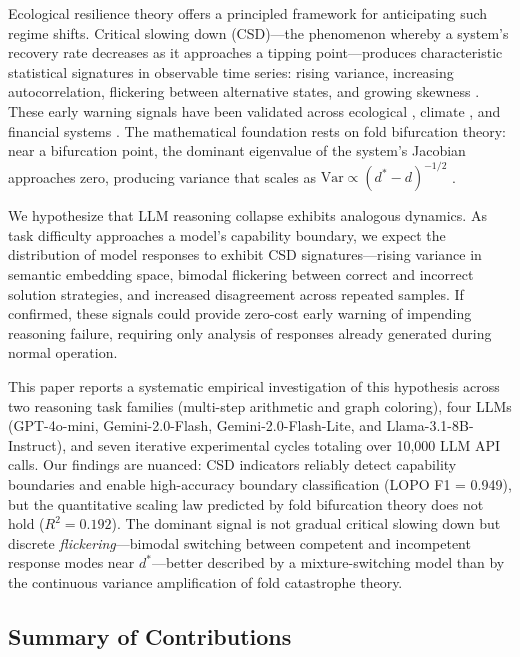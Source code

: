 \documentclass[11pt,letterpaper]{article}
\begin{document}
Ecological resilience theory offers a principled framework for anticipating such regime shifts. Critical slowing down (CSD)---the phenomenon whereby a system's recovery rate decreases as it approaches a tipping point---produces characteristic statistical signatures in observable time series: rising variance, increasing autocorrelation, flickering between alternative states, and growing skewness \citep{Scheffer2009, Scheffer2012}. These early warning signals have been validated across ecological \citep{Drake2010, Carpenter2006}, climate \citep{Dakos2012}, and financial systems \citep{Guttal2008}. The mathematical foundation rests on fold bifurcation theory: near a bifurcation point, the dominant eigenvalue of the system's Jacobian approaches zero, producing variance that scales as $\text{Var} \propto (d^* - d)^{-1/2}$ \citep{Strogatz2015, Wissel1984}.

We hypothesize that LLM reasoning collapse exhibits analogous dynamics. As task difficulty approaches a model's capability boundary, we expect the distribution of model responses to exhibit CSD signatures---rising variance in semantic embedding space, bimodal flickering between correct and incorrect solution strategies, and increased disagreement across repeated samples. If confirmed, these signals could provide zero-cost early warning of impending reasoning failure, requiring only analysis of responses already generated during normal operation.

This paper reports a systematic empirical investigation of this hypothesis across two reasoning task families (multi-step arithmetic and graph coloring), four LLMs (GPT-4o-mini, Gemini-2.0-Flash, Gemini-2.0-Flash-Lite, and Llama-3.1-8B-Instruct), and seven iterative experimental cycles totaling over 10,000 LLM API calls. Our findings are nuanced: CSD indicators reliably detect capability boundaries and enable high-accuracy boundary classification (LOPO F1 = 0.949), but the quantitative scaling law predicted by fold bifurcation theory does not hold ($R^2 = 0.192$). The dominant signal is not gradual critical slowing down but discrete \emph{flickering}---bimodal switching between competent and incompetent response modes near $d^*$---better described by a mixture-switching model than by the continuous variance amplification of fold catastrophe theory.

\subsection*{Summary of Contributions}
\end{document}
